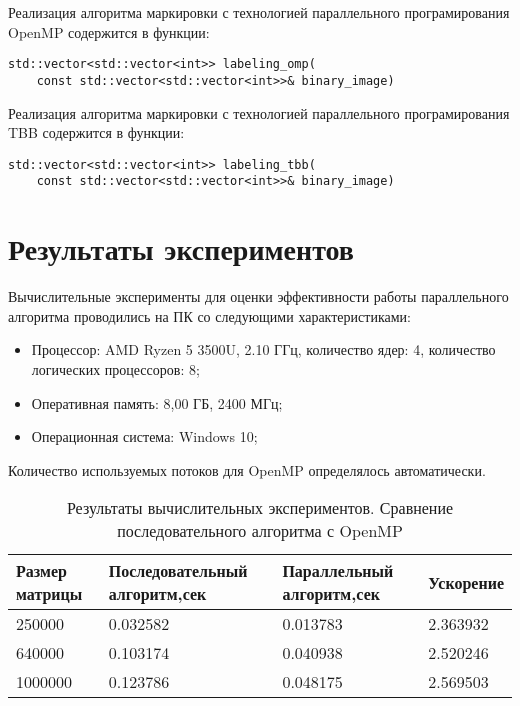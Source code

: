 \documentclass[12pt]{article}
\begin{document}
\par Реализация алгоритма маркировки  с технологией параллельного програмирования OpenMP содержится в функции:
\begin{lstlisting}
std::vector<std::vector<int>> labeling_omp(
    const std::vector<std::vector<int>>& binary_image) 
\end{lstlisting}
\par Реализация алгоритма маркировки с технологией параллельного програмирования TBB содержится в функции:
\begin{lstlisting}
std::vector<std::vector<int>> labeling_tbb(
    const std::vector<std::vector<int>>& binary_image) 
\end{lstlisting}
\newpage

\section*{Результаты экспериментов}
Вычислительные эксперименты для оценки эффективности работы параллельного алгоритма проводились на ПК со следующими характеристиками:
\begin{itemize}
\item Процессор: AMD Ryzen 5 3500U, 2.10 ГГц, количество ядер: 4, количество логических процессоров: 8;
\item Оперативная память: 8,00 ГБ, 2400 МГц; 
\item Операционная система: Windows 10;
\end{itemize}

\par Количество используемых потоков для OpenMP определялось автоматически.
\begin{table}[!h]
\caption{Результаты вычислительных экспериментов. Сравнение последовательного алгоритма с OpenMP}
\centering
\begin{tabular}{|p{4cm}|p{4cm}|p{4cm}|p{3cm}|}
\hline
Размер матрицы & Последовательный алгоритм,сек & Параллельный алгоритм,сек & Ускорение  \\\hline
250000  & 0.032582 & 0.013783 & 2.363932  \\\hline
640000  & 0.103174 & 0.040938 & 2.520246  \\\hline
1000000 & 0.123786 & 0.048175 & 2.569503  \\
\hline
\end{tabular}
\end{table}
\end{document}
